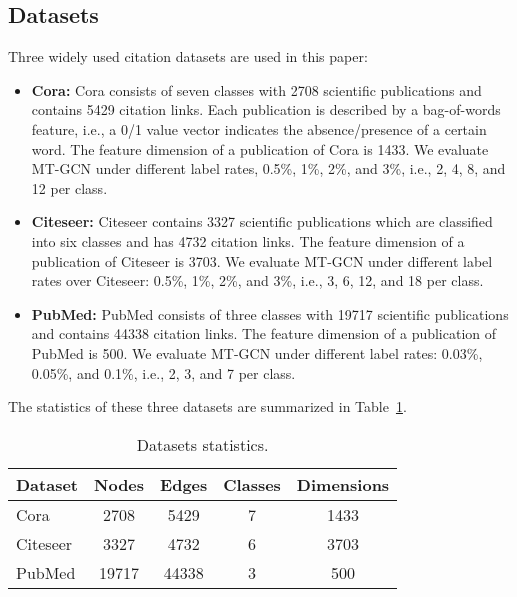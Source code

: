 \documentclass{article}
\begin{document}
\subsection{Datasets}
Three widely used  citation datasets are used in this paper:
\begin{itemize}
    \item {\bf Cora:} Cora consists of seven classes with 2708 scientific publications and contains 5429 citation links. Each publication is described by a bag-of-words feature, i.e., a 0/1 value vector indicates the absence/presence of a certain word. The feature dimension of a publication of Cora is 1433. We evaluate MT-GCN under different label rates, 0.5\%, 1\%, 2\%, and 3\%, i.e., 2, 4, 8, and 12 per class.

  \item {\bf Citeseer:} Citeseer contains 3327 scientific publications which are classified into six classes and has 4732 citation links. The feature dimension of a publication of Citeseer is 3703. We evaluate MT-GCN under different label rates over Citeseer: 0.5\%, 1\%, 2\%, and 3\%, i.e., 3, 6, 12, and 18 per class.

  \item {\bf PubMed:} PubMed consists of three classes with 19717 scientific publications and contains 44338 citation links. The feature dimension of a publication of PubMed is 500. We evaluate MT-GCN under different label rates: 0.03\%, 0.05\%, and 0.1\%, i.e., 2, 3, and 7 per class.
\end{itemize}

The statistics of these three datasets are summarized in Table~\ref{dataset}.
\begin{table}[!ht]
  \caption{Datasets statistics.}
  \label{dataset}
  \centering
  \begin{tabular}{l|cccc}
    \hline
    Dataset & Nodes & Edges & Classes & Dimensions \\
    \hline
    Cora & 2708 & 5429 & 7 & 1433 \\
    Citeseer & 3327 & 4732 & 6 & 3703 \\
    PubMed & 19717 & 44338 & 3 & 500 \\
    \hline
  \end{tabular}
\end{table}
\end{document}
